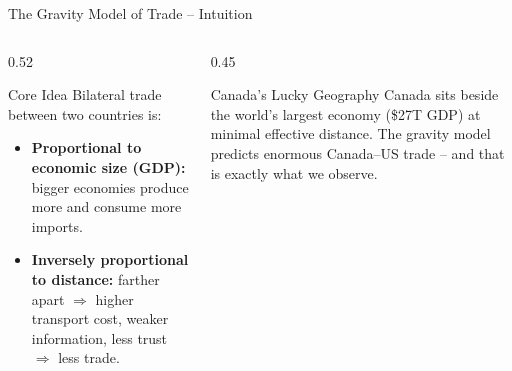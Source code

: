 \documentclass[aspectratio=169]{beamer}
\begin{document}
\begin{frame}{The Gravity Model of Trade -- Intuition}
\begin{columns}[T]
\begin{column}{0.52\textwidth}
\begin{block}{Core Idea}
Bilateral trade between two countries is:
\begin{itemize}
  \item \textbf{Proportional to economic size (GDP):} bigger economies produce more and consume more imports.
  \item \textbf{Inversely proportional to distance:} farther apart $\Rightarrow$ higher transport cost, weaker information, less trust $\Rightarrow$ less trade.
\end{itemize}
\end{block}
\vspace{0.3em}

\end{column}
\begin{column}{0.45\textwidth}
\vspace{0.3em}
\begin{insight}{Canada's Lucky Geography}
\small Canada sits beside the world's largest economy (\$27T GDP) at minimal effective distance. The gravity model predicts enormous Canada–US trade -- and that is exactly what we observe.
\end{insight}
\end{column}
\end{columns}
\end{frame}
\end{document}
